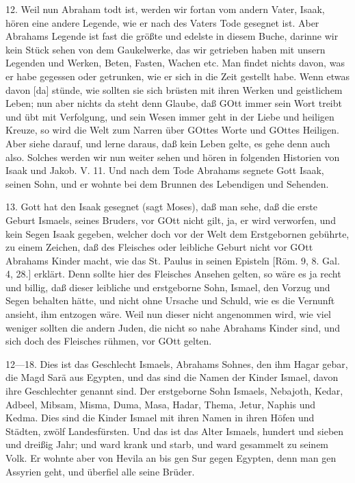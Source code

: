 12. Weil nun Abraham todt ist, werden wir fortan vom andern Vater, Isaak, hören eine andere Legende, wie er nach des Vaters Tode gesegnet ist. Aber Abrahams Legende ist fast die größte und edelste in diesem Buche, darinne wir kein Stück sehen von dem Gaukelwerke, das wir getrieben haben mit unsern Legenden und Werken, Beten, Fasten, Wachen etc. Man findet nichts davon, was er habe gegessen oder getrunken, wie er sich in die Zeit gestellt habe. Wenn etwas davon [da] stünde, wie sollten sie sich brüsten mit ihren Werken und geistlichem Leben; nun aber nichts da steht denn Glaube, daß GOtt immer sein Wort treibt und übt mit Verfolgung, und sein Wesen immer geht in der Liebe und heiligen Kreuze, so wird die Welt zum Narren über GOttes Worte und GOttes Heiligen. Aber siehe darauf, und lerne daraus, daß kein Leben gelte, es gehe denn auch also. Solches werden wir nun weiter sehen und hören in folgenden Historien von Isaak und Jakob.
V. 11. Und nach dem Tode Abrahams segnete Gott Isaak, seinen Sohn, und er wohnte bei dem Brunnen des Lebendigen und Sehenden.

13. Gott hat den Isaak gesegnet (sagt Moses), daß man sehe, daß die erste Geburt Ismaels, seines Bruders, vor GOtt nicht gilt, ja, er wird verworfen, und kein Segen Isaak gegeben, welcher doch vor der Welt dem Erstgebornen gebührte, zu einem Zeichen, daß des Fleisches oder leibliche Geburt nicht vor GOtt Abrahams Kinder macht, wie das St. Paulus in seinen Episteln [Röm. 9, 8. Gal. 4, 28.] erklärt. Denn sollte hier des Fleisches Ansehen gelten, so wäre es ja recht und billig, daß dieser leibliche und erstgeborne Sohn, Ismael, den Vorzug und Segen behalten hätte, und nicht ohne Ursache und Schuld, wie es die Vernunft ansieht, ihm entzogen wäre. Weil nun dieser nicht angenommen wird, wie viel weniger sollten die andern Juden, die nicht so nahe Abrahams Kinder sind, und sich doch des Fleisches rühmen, vor GOtt gelten.

12—18. Dies ist das Geschlecht Ismaels, Abrahams Sohnes, den ihm Hagar gebar, die Magd Sarä aus Egypten, und das sind die Namen der Kinder Ismael, davon ihre Geschlechter genannt sind. Der erstgeborne Sohn Ismaels, Nebajoth, Kedar, Adbeel, Mibsam, Misma, Duma, Masa, Hadar, Thema, Jetur, Naphis und Kedma. Dies sind die Kinder Ismael mit ihren Namen in ihren Höfen und Städten, zwölf Landesfürsten. Und das ist das Alter Ismaels, hundert und sieben und dreißig Jahr; und ward krank und starb, und ward gesammelt zu seinem Volk. Er wohnte aber von Hevila an bis gen Sur gegen Egypten, denn man gen Assyrien geht, und überfiel alle seine Brüder.

